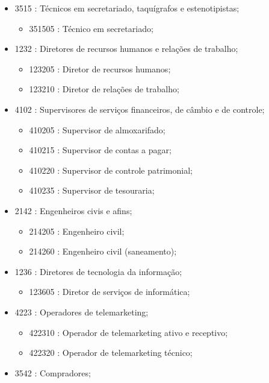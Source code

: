 \begin{itemize}
\begin{itemize}
\begin{itemize}
    \end{itemize}
    \item 3515 : Técnicos em secretariado, taquígrafos e estenotipistas;
    \begin{itemize}
      \item 351505 : Técnico em secretariado;
    \end{itemize}
    \item 1232 : Diretores de recursos humanos e relações de trabalho;
    \begin{itemize}
      \item 123205 : Diretor de recursos humanos;
      \item 123210 : Diretor de relações de trabalho;
    \end{itemize}
    \item 4102 : Supervisores de serviços financeiros, de câmbio e de controle;
    \begin{itemize}
      \item 410205 : Supervisor de almoxarifado;
      \item 410215 : Supervisor de contas a pagar;
      \item 410220 : Supervisor de controle patrimonial;
      \item 410235 : Supervisor de tesouraria;
    \end{itemize}
    \item 2142 : Engenheiros civis e afins;
    \begin{itemize}
      \item 214205 : Engenheiro civil;
      \item 214260 : Engenheiro civil (saneamento);
    \end{itemize}
    \item 1236 : Diretores de tecnologia da informação;
    \begin{itemize}
      \item 123605 : Diretor de serviços de informática;
    \end{itemize}
    \item 4223 : Operadores de telemarketing;
    \begin{itemize}
      \item 422310 : Operador de telemarketing ativo e receptivo;
      \item 422320 : Operador de telemarketing técnico;
    \end{itemize}
    \item 3542 : Compradores;
    \begin{itemize}

\end{itemize}
\end{itemize}
\end{itemize}
